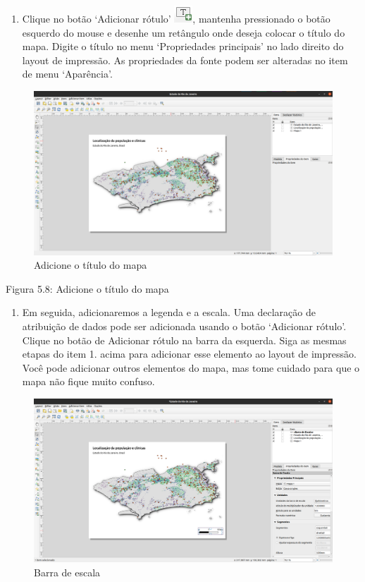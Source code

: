 \documentclass[
  portuguese,
]{krantz}
\providecommand{\tightlist}{%
  \setlength{\itemsep}{0pt}\setlength{\parskip}{0pt}}
\begin{document}
\begin{enumerate}
\def\labelenumi{\arabic{enumi}.}
\tightlist
\item
  Clique no botão `Adicionar rótulo' \includegraphics{media/modulo5/add_title.png}, mantenha pressionado o botão esquerdo do mouse e desenhe um retângulo onde deseja colocar o título do mapa. Digite o título no menu `Propriedades principais' no lado direito do layout de impressão. As propriedades da fonte podem ser alteradas no item de menu `Aparência'.
\end{enumerate}

\begin{figure}
\centering
\includegraphics{media/modulo5/print-layout-with-title.png}
\caption{Adicione o título do mapa}
\end{figure}

Figura 5.8: Adicione o título do mapa

\begin{enumerate}
\def\labelenumi{\arabic{enumi}.}
\setcounter{enumi}{1}
\tightlist
\item
  Em seguida, adicionaremos a legenda e a escala. Uma declaração de atribuição de dados pode ser adicionada usando o botão `Adicionar rótulo'. Clique no botão de Adicionar rótulo na barra da esquerda. Siga as mesmas etapas do item 1. acima para adicionar esse elemento ao layout de impressão. Você pode adicionar outros elementos do mapa, mas tome cuidado para que o mapa não fique muito confuso.
\end{enumerate}

\begin{figure}
\centering
\includegraphics{media/modulo5/scale-bar.png}
\caption{Barra de escala}
\end{figure}
\end{document}
